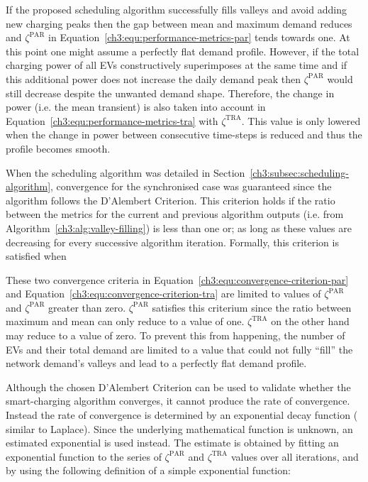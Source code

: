 If the proposed scheduling algorithm successfully fills valleys and avoid adding new charging peaks then the gap between mean and maximum demand reduces and $\zeta^\text{PAR}$ in Equation~\ref{ch3:equ:performance-metrics-par} tends towards one.
At this point one might assume a perfectly flat demand profile.
However, if the total charging power of all EVs constructively superimposes at the same time and if this additional power does not increase the daily demand peak then $\zeta^\text{PAR}$ would still decrease despite the unwanted demand shape.
Therefore, the change in power (i.e. the mean transient) is also taken into account in Equation~\ref{ch3:equ:performance-metrics-tra} with $\zeta^\text{TRA}$.
This value is only lowered when the change in power between consecutive time-steps is reduced and thus the profile becomes smooth.

When the scheduling algorithm was detailed in Section~\ref{ch3:subsec:scheduling-algorithm}, convergence for the synchronised case was guaranteed since the algorithm follows the D'Alembert Criterion.
This criterion holds if the ratio between the metrics for the current and previous algorithm outputs (i.e. from Algorithm~\ref{ch3:alg:valley-filling}) is less than one or; as long as these values are decreasing for every successive algorithm iteration.
Formally, this criterion is satisfied when



These two convergence criteria in Equation~\ref{ch3:equ:convergence-criterion-par} and Equation~\ref{ch3:equ:convergence-criterion-tra} are limited to values of $\zeta^\text{PAR}$ and $\zeta^\text{PAR}$ greater than zero.
$\zeta^\text{PAR}$ satisfies this criterium since the ratio between maximum and mean can only reduce to a value of one.
$\zeta^\text{TRA}$ on the other hand may reduce to a value of zero.
To prevent this from happening, the number of EVs and their total demand are limited to a value that could not fully ``fill'' the network demand's valleys and lead to a perfectly flat demand profile.

Although the chosen D'Alembert Criterion can be used to validate whether the smart-charging algorithm converges, it cannot produce the rate of convergence.
Instead the rate of convergence is determined by an exponential decay function ( similar to Laplace).
Since the underlying mathematical function is unknown, an estimated exponential is used instead.
The estimate is obtained by fitting an exponential function to the series of $\zeta^\text{PAR}$ and $\zeta^\text{TRA}$ values over all iterations, and by using the following definition of a simple exponential function:

